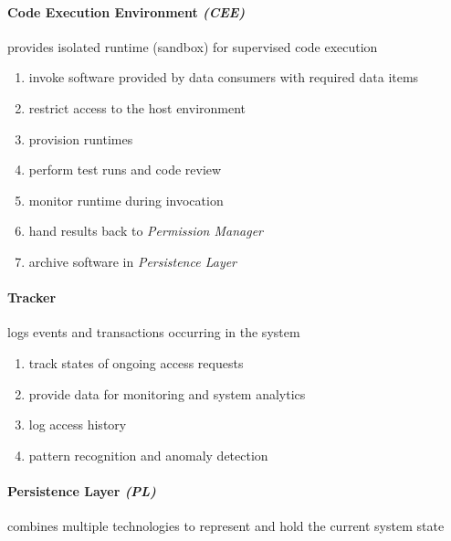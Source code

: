 \documentclass[12pt,english,a4paper,titlepage,cleardoublepage=empty,dottedtoc]{report}
\providecommand{\tightlist}{%
  \setlength{\itemsep}{0pt}\setlength{\parskip}{0pt}}
\begin{document}
\paragraph{\texorpdfstring{Code Execution Environment
\emph{(CEE)}}{Code Execution Environment (CEE)}}\label{code-execution-environment-cee}

provides isolated runtime (sandbox) for supervised code execution

\begin{enumerate}
\def\labelenumi{\alph{enumi})}
\tightlist
\item
  invoke software provided by data consumers with required data items
\item
  restrict access to the host environment
\item
  provision runtimes
\item
  perform test runs and code review
\item
  monitor runtime during invocation
\item
  hand results back to \emph{Permission Manager}
\item
  archive software in \emph{Persistence Layer}
\end{enumerate}

\paragraph{Tracker}\label{tracker-1}

logs events and transactions occurring in the system

\begin{enumerate}
\def\labelenumi{\alph{enumi})}
\tightlist
\item
  track states of ongoing access requests
\item
  provide data for monitoring and system analytics
\item
  log access history
\item
  pattern recognition and anomaly detection
\end{enumerate}

\paragraph{\texorpdfstring{Persistence Layer
\emph{(PL)}}{Persistence Layer (PL)}}\label{persistence-layer-pl}

combines multiple technologies to represent and hold the current system
state
\end{document}
